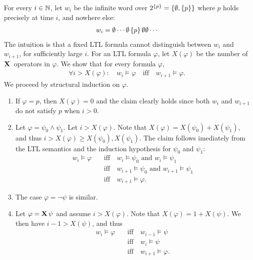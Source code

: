 \begin{solution}
	For every $i \in \mathbb N$, let $w_i$ be the infinite word over $2^{\left\{p\right\}} = \left\{\emptyset, \left\{p\right\}\right\}$
	where $p$ holds precisely at time $i$, and nowhere else:
	\begin{align*}
		w_i = \emptyset \cdots \emptyset \left\{p\right\} \emptyset \emptyset \cdots
	\end{align*}
	The intuition is that a fixed LTL formula cannot distinguish between $w_i$ and $w_{i+1}$,
	for sufficiently large $i$.
	For an LTL formula $\varphi$, let $X(\varphi)$ be the number of $\mathbf X\,$ operators in $\varphi$.
	We show that for every formula $\varphi$,
	\begin{align}
		\label{eq:claim}
		\forall i > X(\varphi): \quad
		w_i \models \varphi
			\quad \text{iff} \quad
				w_{i+1} \models \varphi.
	\end{align}
	We proceed by structural induction on $\varphi$.
	\begin{enumerate}
		\item If $\varphi = p$, then $X(\varphi) = 0$ and the claim clearly holds
		since both $w_i$ and $w_{i+1}$ do not satisfy $p$ when $i > 0$.
		\item Let $\varphi = \psi_0 \land \psi_1$.
		Let $i > X(\varphi)$.
		Note that $X(\varphi) = X(\psi_0) + X(\psi_1)$,
		and thus $i > X(\varphi) \geq X(\psi_0), X(\psi_1)$.
		The claim follows imediately from the LTL semantics
		and the induction hypothesis for $\psi_0$ and $\psi_1$:
		\begin{align*}
			w_i \models \varphi
				&\quad\text{iff}\quad w_i \models \psi_0 \text{ and } w_i \models \psi_1 \\
				&\quad\text{iff}\quad w_{i+1} \models \psi_0 \text{ and } w_{i+1} \models \psi_1 \\
				&\quad\text{iff}\quad w_{i+1} \models \varphi.
		\end{align*}
		\item The case $\varphi = \neg \psi$ is similar.
		\item Let $\varphi = \mathbf X\, \psi$ and assume $i > X(\varphi)$.
		Note that $X(\varphi) = 1 + X(\psi)$.
		We then have $i - 1 > X(\psi)$, and thus
		\begin{align*}
			w_i \models \varphi
				&\quad\text{iff}\quad w_{i-1} \models \psi \\
				&\quad\text{iff}\quad w_i \models \psi \\
				&\quad\text{iff}\quad w_{i+1} \models \varphi.
		\end{align*}

\end{enumerate}
\end{solution}
